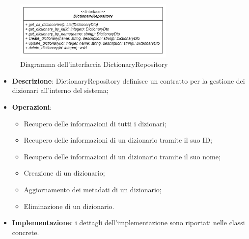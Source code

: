 \label{DictionaryRepository}
\begin{figure}[H]
    \centering
    \includegraphics[width=0.7\textwidth]{assets/Backend/dictionary_repository.png}
    \caption{Diagramma dell'interfaccia DictionaryRepository}
  \end{figure}
\begin{itemize}
  \item \textbf{Descrizione}: DictionaryRepository definisce un contratto per la gestione dei dizionari all'interno del sistema; 
  \item \textbf{Operazioni}: 
    \begin{itemize}
      \item Recupero delle informazioni di tutti i dizionari;
      \item Recupero delle informazioni di un dizionario tramite il suo ID;
      \item Recupero delle informazioni di un dizionario tramite il suo nome;
      \item Creazione di un dizionario;
      \item Aggiornamento dei metadati di un dizionario;
      \item Eliminazione di un dizionario.
    \end{itemize}
  \item \textbf{Implementazione}: i dettagli dell'implementazione sono riportati nelle classi concrete.
\end{itemize} 

